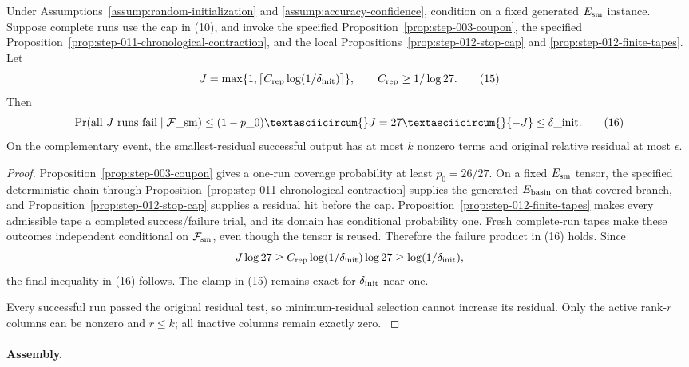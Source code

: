 \begin{proposition}\label{prop:step-012-restart}
Under Assumptions~\ref{assump:random-initialization} and
\ref{assump:accuracy-confidence}, condition on a fixed generated
\(E_{\rm sm}\) instance. Suppose complete runs use the cap in (10), and
invoke the specified Proposition~\ref{prop:step-003-coupon}, the specified Proposition~\ref{prop:step-011-chronological-contraction}, and the local
Propositions~\ref{prop:step-012-stop-cap} and
\ref{prop:step-012-finite-tapes}. Let
\[
 J=\max\{1,\lceil C_{\rm rep}\log(1/\delta_{\rm init})\rceil\},
 \qquad C_{\rm rep}\ge1/\log27.
\tag{15}
\]
Then
\[
 \Pr(\text{all \(J\) runs fail}\mid{\cal F}\_{\rm sm})
 \le(1-p\_0)\textasciicircum{}J=27\textasciicircum{}{-J}\le\delta\_{\rm init}.
\tag{16}
\]
On the complementary event, the smallest-residual successful output has at
most \(k\) nonzero terms and original relative residual at most \(\epsilon\).

\begin{proof}
Proposition~\ref{prop:step-003-coupon} gives a one-run coverage probability
at least \(p_0=26/27\). On a fixed \(E_{\rm sm}\) tensor, the specified deterministic chain through
Proposition~\ref{prop:step-011-chronological-contraction} supplies the
generated \(E_{\rm basin}\) on that covered branch, and
Proposition~\ref{prop:step-012-stop-cap} supplies a residual hit before the
cap. Proposition~\ref{prop:step-012-finite-tapes} makes every admissible tape
a completed success/failure trial, and its domain has conditional probability
one. Fresh complete-run tapes make these outcomes independent conditional on
\({\cal F}_{\rm sm}\), even though the tensor is reused. Therefore the
failure product in (16) holds. Since
\[
 J\log27\ge C_{\rm rep}\log(1/\delta_{\rm init})\log27
 \ge\log(1/\delta_{\rm init}),
\]
the final inequality in (16) follows. The clamp in (15) remains exact for
\(\delta_{\rm init}\) near one.

Every successful run passed the original residual test, so minimum-residual
selection cannot increase its residual. Only the active rank-\(r\) columns
can be nonzero and \(r\le k\); all inactive columns remain exactly zero.
\(\)

\end{proof}
\end{proposition}
\paragraph{Assembly.}

